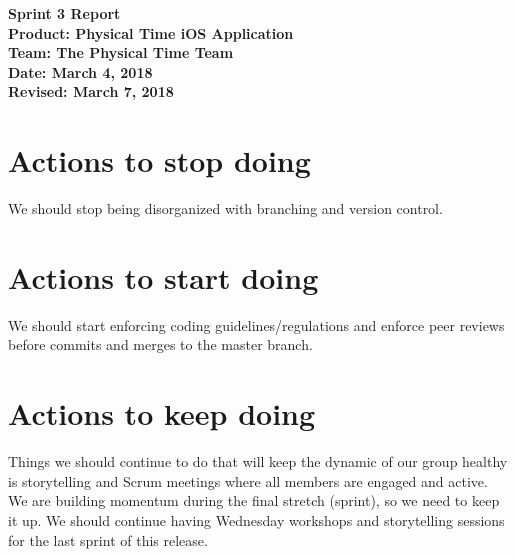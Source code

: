 \documentclass[11pt]{article}
\newcommand\tab[1][1cm]{\hspace*{#1}}
\begin{document}
	\Large{\textbf{Sprint 3 Report}}\\
	\Large{\textbf{Product: Physical Time iOS Application}}\\
	\Large{\textbf{Team: The Physical Time Team}}\\
	\Large{\textbf{Date: March 4, 2018}}\\
	\Large{\textbf{Revised: March 7, 2018}}\\
	
	\vspace{-3mm}
	
	\section{Actions to stop doing}
		\vspace{-3mm}
		\tab \normalsize{We should stop being disorganized with branching and version control.}
		
	\section{Actions to start doing}
		\vspace{-3mm}
		\tab \normalsize{We should start enforcing coding guidelines/regulations and enforce peer reviews before commits and merges to the master branch.}
		
	\section{Actions to keep doing}
		\vspace{-3mm}
		\tab \normalsize{Things we should continue to do that will keep the dynamic of our group healthy is storytelling and Scrum meetings where all members are engaged and active. We are building momentum during the final stretch (sprint), so we need to keep it up.  We should continue having Wednesday workshops and storytelling sessions for the last sprint of this release.}
		
\end{document}

